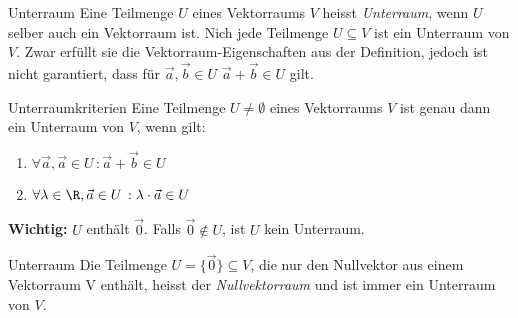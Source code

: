     \begin{definition}{Unterraum}
        Eine Teilmenge $U$ eines Vektorraums $V$ heisst \textit{Unterraum}, wenn $U$ selber auch ein Vektorraum ist.
        Nich jede Teilmenge $U\subseteq V$ ist ein Unterraum von $V$. Zwar erfüllt sie die Vektorraum-Eigenschaften
        aus der Definition, jedoch ist nicht garantiert, dass für $\vec{a},\vec{b}\in U$ $\vec{a}+\vec{b}\in U$ gilt. 
    \end{definition}

    \begin{theorem}{Unterraumkriterien}
        Eine Teilmenge $U\neq\emptyset$ eines Vektorraums $V$ ist genau dann ein Unterraum von $V$, wenn gilt:
        \begin{enumerate}
            \item $\forall \vec{a},\vec{a}\in U\,:\vec{a}+\vec{b}\in U$
            \item $\forall \lambda\in\R,\vec{a}\in U\,:\lambda\cdot\vec{a}\in U$
        \end{enumerate}
        \textbf{Wichtig:} $U$ enthält $\vec{0}$. Falls $\vec{0}\notin U$, ist $U$ kein Unterraum. 
    \end{theorem}

    \begin{definition}{Unterraum}
        Die Teilmenge $U=\{\vec{0}\}\subseteq V$, die nur den Nullvektor aus einem Vektorraum V enthält, 
        heisst der \textit{Nullvektorraum} und ist immer ein Unterraum von $V$.
    \end{definition}